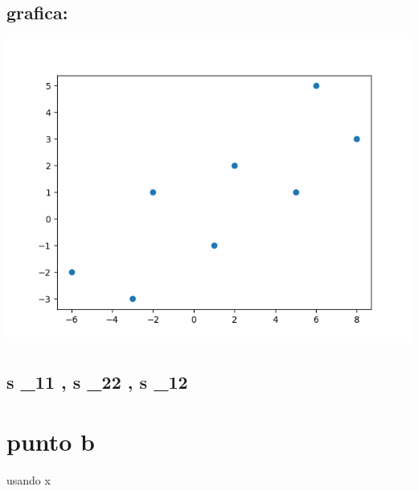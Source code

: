 \documentclass[10pt,a4paper]{article} %
\begin{document}
        \subsection{grafica:}
        \includegraphics[width=0.8\linewidth]{diagrama_dispersion_x1_x2}
        \subsection{s _{11} , s _{22} , s _{12}   }
    \section{punto b}
        usando \hat x
        
            

        







    
    \nocite{*}
    
    
\end{document}
